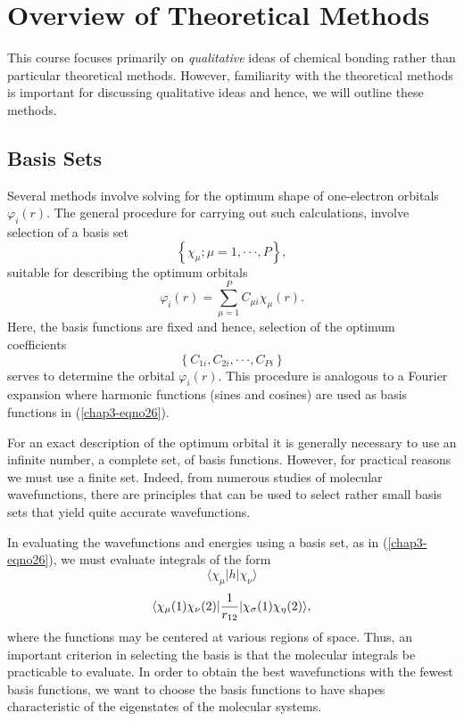 \section{Overview of Theoretical Methods}

This course focuses primarily on \emph{qualitative} ideas of chemical
bonding rather than particular theoretical methods. However,
familiarity with the theoretical methods is important for discussing
qualitative ideas and hence, we will outline these methods.

\subsection{Basis Sets}

Several methods involve solving for the optimum shape of one-electron orbitals
$\varphi_i(r)$. The general procedure for carrying out such calculations,
involve selection of a basis set
\begin{equation}
\left\{ \chi_{\mu} ; \mu = 1 , \cdot \cdot \cdot , P 
\right\},
\label{chap3-eqno26}
\end{equation}
suitable for describing the optimum orbitals
\begin{equation}
\varphi_i ( r ) = \sum^{P}_{\mu = 1} C_{\mu i} \chi_{\mu} ( r ) .
\end{equation}
Here, the basis functions are fixed and hence, selection of the optimum 
coefficients
\begin{equation}
\left\{ C_{1i} , C_{2i} , \cdot \cdot \cdot , C_{Pi} \right\}
\end{equation}
serves to determine the orbital $\varphi_i(r)$.  This procedure is 
analogous to a Fourier expansion where harmonic functions (sines and 
cosines) are used as basis functions in (\ref{chap3-eqno26}).

For an exact description of the optimum orbital it is generally necessary 
to use an infinite number, a complete set, of basis functions.  However, 
for practical reasons we must use a finite set.  Indeed, from numerous 
studies of molecular wavefunctions, there are principles that can be used 
to select rather small basis sets that yield quite accurate wavefunctions.

In evaluating the wavefunctions and energies using a basis set, as in 
(\ref{chap3-eqno26}), we must evaluate integrals of the form
\begin{equation}
\langle \chi_{\mu} \vert h \vert \chi_{\nu} \rangle
\label{chap3-eqno27a}
\end{equation}
\begin{equation}
\langle \chi_{\mu} ( 1 ) \chi_{\nu} ( 2 ) \vert {1 \over r_{12}} 
\vert \chi_{\sigma} ( 1 ) \chi_{\eta} ( 2 ) \rangle ,
\label{chap3-eqno27b}
\end{equation}
where the functions may be centered at various regions of space. Thus, an
important criterion in selecting the basis is that the molecular integrals be
practicable to evaluate.  In order to obtain the best wavefunctions 
with the fewest basis functions, we want to choose the basis functions 
to have shapes characteristic of the eigenstates of the molecular systems.


